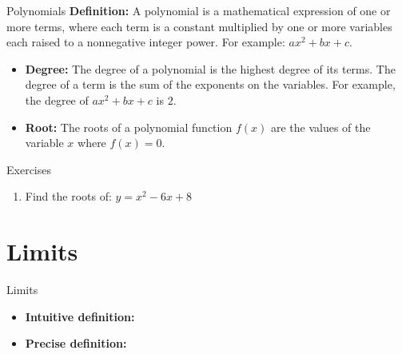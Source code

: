 \documentclass[]{beamer}
\begin{document}
    \begin{frame}{Polynomials}
        \textbf{Definition:} A polynomial is a mathematical expression of one or more terms, where each term is a constant multiplied by one or more variables each raised to a nonnegative integer power. For example: $ax^2 + bx + c$. \\
        
            \begin{itemize}
                \item<3-> \textbf{Degree:} The degree of a polynomial is the highest degree of its terms. The degree of a term is the sum of the exponents on the variables. For example, the degree of $ax^2 + bx + c$ is $2$.
                \item<4-> \textbf{Root:} The roots of a polynomial function $f(x)$ are the values of the variable $x$ where $f(x)=0$.  
            \end{itemize}
    \end{frame}

    \begin{frame}{Exercises}
        \begin{enumerate}
            \item Find the roots of: $y=x^2 - 6x + 8$
        \end{enumerate}
    \end{frame}

\section{Limits}
    \begin{frame}{Limits}
        \begin{itemize}

            \item<2->\textbf{Intuitive definition:}
            \item<4->\textbf{Precise definition:}
        \end{itemize}
    \end{frame}
\end{document}
